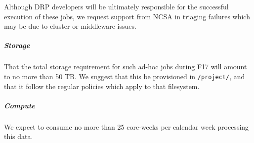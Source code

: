 Although DRP developers will be ultimately responsible for the
successful execution of these jobs, we request support from NCSA in
triaging failures which may be due to cluster or middleware issues.

\subparagraph{Storage}\label{storage-1}

That the total storage requirement for such ad-hoc jobs during F17 will
amount to no more than 50 TB. We suggest that this be provisioned in
\texttt{/project/}, and that it follow the regular policies which apply
to that filesystem.

\subparagraph{Compute}\label{compute-1}

We expect to consume no more than 25 core-weeks per calendar week
processing this data.
